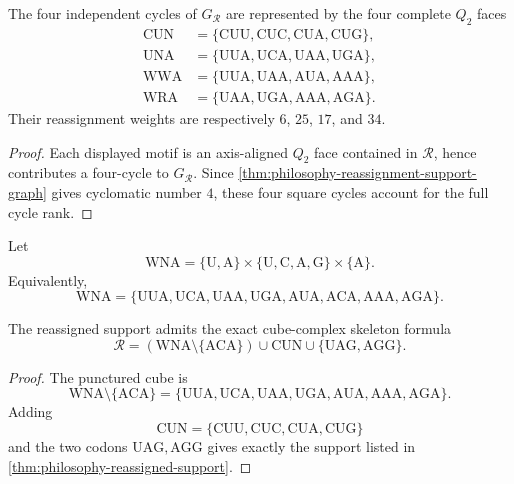\begin{theorem}
\label{thm:philosophy-four-square-cycles}
The four independent cycles of $G_{\mathcal{R}}$ are represented by the
four complete $Q_{2}$ faces
$$
\begin{aligned}
  \mathrm{CUN}&=\{\mathrm{CUU},\mathrm{CUC},\mathrm{CUA},\mathrm{CUG}\},\\
  \mathrm{UNA}&=\{\mathrm{UUA},\mathrm{UCA},\mathrm{UAA},\mathrm{UGA}\},\\
  \mathrm{WWA}&=\{\mathrm{UUA},\mathrm{UAA},\mathrm{AUA},\mathrm{AAA}\},\\
  \mathrm{WRA}&=\{\mathrm{UAA},\mathrm{UGA},\mathrm{AAA},\mathrm{AGA}\}.
\end{aligned}
$$
Their reassignment weights are respectively $6$, $25$, $17$, and $34$.
\end{theorem}
\begin{proof}
Each displayed motif is an axis-aligned $Q_{2}$ face contained in
$\mathcal{R}$, hence contributes a four-cycle to $G_{\mathcal{R}}$.
Since \autoref{thm:philosophy-reassignment-support-graph} gives
cyclomatic number $4$, these four square cycles account for the full
cycle rank.
\end{proof}

\begin{definition}
\label{def:philosophy-punctured-wna-cube}
Let
$$
  \mathrm{WNA}=\{\mathrm{U},\mathrm{A}\}
  \times\{\mathrm{U},\mathrm{C},\mathrm{A},\mathrm{G}\}
  \times\{\mathrm{A}\}.
$$
Equivalently,
$$
  \mathrm{WNA}
  =
  \{\mathrm{UUA},\mathrm{UCA},\mathrm{UAA},\mathrm{UGA},
    \mathrm{AUA},\mathrm{ACA},\mathrm{AAA},\mathrm{AGA}\}.
$$
\end{definition}

\begin{theorem}
\label{thm:philosophy-punctured-cube-skeleton-formula}
The reassigned support admits the exact cube-complex skeleton formula
$$
  \mathcal{R}
  =
  (\mathrm{WNA}\setminus\{\mathrm{ACA}\})
  \cup
  \mathrm{CUN}
  \cup
  \{\mathrm{UAG},\mathrm{AGG}\}.
$$
\end{theorem}
\begin{proof}
The punctured cube is
$$
  \mathrm{WNA}\setminus\{\mathrm{ACA}\}
  =
  \{\mathrm{UUA},\mathrm{UCA},\mathrm{UAA},\mathrm{UGA},
    \mathrm{AUA},\mathrm{AAA},\mathrm{AGA}\}.
$$
Adding
$$
  \mathrm{CUN}=\{\mathrm{CUU},\mathrm{CUC},\mathrm{CUA},\mathrm{CUG}\}
$$
and the two codons $\mathrm{UAG},\mathrm{AGG}$ gives exactly the
support listed in \autoref{thm:philosophy-reassigned-support}.
\end{proof}

